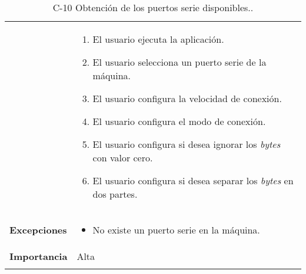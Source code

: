 \begin{longtable}[H]{@{}ll@{}}
\begin{minipage}[t]{0.23\columnwidth}
\end{minipage} & \begin{minipage}[t]{0.71\columnwidth}\raggedright\strut
\begin{enumerate}
\def\labelenumi{\arabic{enumi}.}
\item
El usuario ejecuta la aplicación.
\item
El usuario selecciona un puerto serie de la máquina.
\item
El usuario configura la velocidad de conexión.
\item
El usuario configura el modo de conexión.
\item
El usuario configura si desea ignorar los \emph{bytes} con valor cero.
\item
El usuario configura si desea separar los \emph{bytes} en dos partes.
\end{enumerate}\strut
\end{minipage}\tabularnewline
\begin{minipage}[t]{0.23\columnwidth}\raggedright\strut
\textbf{Excepciones}\strut
\end{minipage} & \begin{minipage}[t]{0.71\columnwidth}\raggedright\strut
\begin{itemize}
\item
No existe un puerto serie en la máquina.
\end{itemize}\strut
\end{minipage}\tabularnewline
\begin{minipage}[t]{0.23\columnwidth}\raggedright\strut
\textbf{Importancia}\strut
\end{minipage} & \begin{minipage}[t]{0.71\columnwidth}\raggedright\strut
Alta\strut
\end{minipage}\tabularnewline
\bottomrule
\caption{C-10 Obtención de los puertos serie disponibles..}
\end{longtable}


